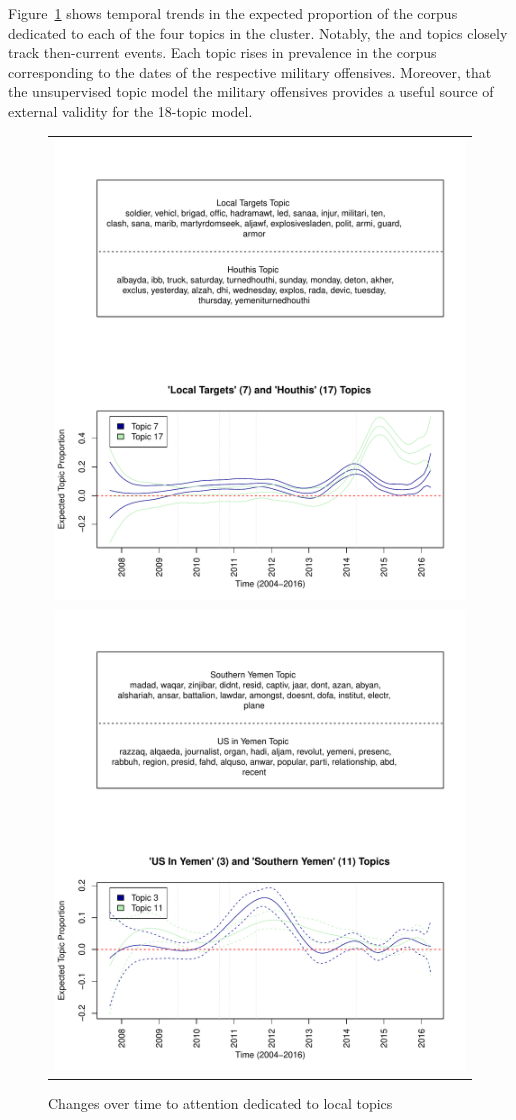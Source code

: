 Figure~\ref{fig:houthisLT} shows temporal trends in the expected proportion of the corpus dedicated to each of the four topics in the  cluster. Notably, the  and  topics closely track then-current events. Each topic rises in prevalence in the corpus corresponding to the dates of the respective military offensives. Moreover, that the unsupervised topic model  the military offensives provides a useful source of external validity for the 18-topic model.

\begin{figure}
\begin{center}
\caption{Changes over time to attention dedicated to local topics}
  \label{fig:houthisLT}
  \begin{tabular}{c}
    \includegraphics[width=.65\columnwidth]{./Pictures/HouthiandLT_UT7_K18.pdf}\\
\includegraphics[width=.65\columnwidth]{./Pictures/AASAndMiscYemen_UT7_K18.pdf}\\
  \end{tabular} 
\end{center}
  \end{figure}

